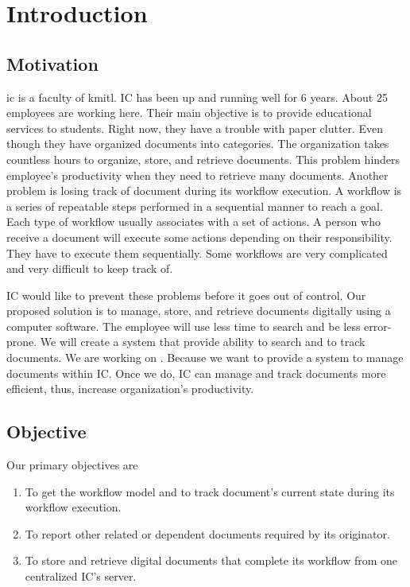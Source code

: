 \chapter{Introduction}

\section{Motivation}
\gls{ic} is a faculty of \gls{kmitl}. 
IC has been up and running well for 6 years.
About 25 employees are working here. %
Their main objective is to provide educational services to students. 
Right now, they have a trouble with paper clutter. 
Even though they have organized documents into categories. 
The organization takes countless hours to organize, store, and retrieve documents.
This problem hinders employee's productivity when they need to retrieve many documents. 
Another problem is losing track of document during its workflow execution. 
A workflow is a series of repeatable steps performed in a sequential manner to reach a goal.
Each type of workflow usually associates with a set of actions. 
A person who receive a document will execute some actions depending on their responsibility.
They have to execute them sequentially. 
Some workflows are very complicated and very difficult to keep track of.

IC would like to prevent these problems before it goes out of control. 
Our proposed solution is to manage, store, and retrieve documents digitally using a computer software.
The employee will use less time to search and be less error-prone.
We will create a system that provide ability to search and to track documents.
We are working on \dms.
Because we want to provide a system to manage documents within IC.
Once we do, IC can manage and track documents more efficient, thus, increase organization's productivity.

\section{Objective}
Our primary objectives are
\begin{enumerate}
\item To get the workflow model and to track document's current state during its workflow execution. 
\item To report other related or dependent documents required by its originator.
\item To store and retrieve digital documents that complete its workflow from one centralized IC's server.
\end{enumerate}


